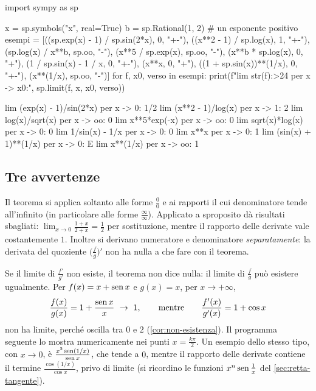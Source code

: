 \begin{python}
import sympy as sp

x = sp.symbols("x", real=True)
b = sp.Rational(1, 2)                    # un esponente positivo
esempi = [((sp.exp(x) - 1) / sp.sin(2*x), 0, "+-"),
          ((x**2 - 1) / sp.log(x), 1, "+-"),
          (sp.log(x) / x**b, sp.oo, "-"),
          (x**5 / sp.exp(x), sp.oo, "-"),
          (x**b * sp.log(x), 0, "+"),
          (1 / sp.sin(x) - 1 / x, 0, "+-"),
          (x**x, 0, "+"),
          ((1 + sp.sin(x))**(1/x), 0, "+-"),
          (x**(1/x), sp.oo, "-")]
for f, x0, verso in esempi:
    print(f"lim {str(f):>24} per x -> {x0}:",
          sp.limit(f, x, x0, verso))
\end{python}
\begin{risultato}
lim    (exp(x) - 1)/sin(2*x) per x -> 0: 1/2
lim        (x**2 - 1)/log(x) per x -> 1: 2
lim           log(x)/sqrt(x) per x -> oo: 0
lim             x**5*exp(-x) per x -> oo: 0
lim           sqrt(x)*log(x) per x -> 0: 0
lim           1/sin(x) - 1/x per x -> 0: 0
lim                     x**x per x -> 0: 1
lim      (sin(x) + 1)**(1/x) per x -> 0: E
lim                 x**(1/x) per x -> oo: 1
\end{risultato}

\subsection{Tre avvertenze}

\begin{attenzione}
Il teorema si applica soltanto alle forme $\frac00$ e ai rapporti il cui denominatore
tende all'infinito (in particolare alle forme $\frac\infty\infty$). Applicato a
sproposito dà risultati sbagliati: $\lim_{x\to0}\frac{1+x}{2+x}=\frac12$ per
sostituzione, mentre il rapporto delle derivate vale costantemente $1$. Inoltre si
derivano numeratore e denominatore \emph{separatamente}: la derivata del quoziente
$\bigl(\frac fg\bigr)'$ non ha nulla a che fare con il teorema.
\end{attenzione}

\begin{attenzione}
Se il limite di $\frac{f'}{g'}$ non esiste, il teorema non dice nulla: il limite di
$\frac fg$ può esistere ugualmente. Per $f(x)=x+\operatorname{sen} x$ e $g(x)=x$, per $x\to+\infty$,
\[
  \frac{f(x)}{g(x)}=1+\frac{\sen x}{x}\ \to\ 1, \qquad\text{mentre}\qquad
  \frac{f'(x)}{g'(x)}=1+\cos x
\]
non ha limite, perché oscilla tra $0$ e $2$ (\cref{cor:non-esistenza}). Il programma
seguente lo mostra numericamente nei punti $x=\frac{k\pi}{2}$. Un esempio dello stesso
tipo, con $x\to0$, è $\frac{x^{2}\operatorname{sen}(1/x)}{\operatorname{sen} x}$, che tende a $0$, mentre il rapporto
delle derivate contiene il termine $\frac{\cos(1/x)}{\cos x}$, privo di limite (si
ricordino le funzioni $x^{n}\operatorname{sen}\frac1x$ del \cref{sec:retta-tangente}).
\end{attenzione}

